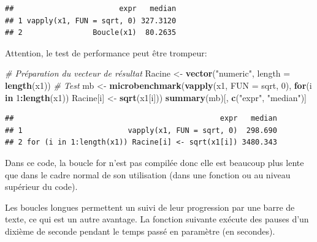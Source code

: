 \documentclass[
  12pt,
  french,
  a4paper,
  extrafontsizes,onecolumn,openright
  ]{memoir}
\newenvironment{Shaded}{\begin{snugshade}}{\end{snugshade}}
\newcommand{\CommentTok}[1]{\textcolor[rgb]{0.56,0.35,0.01}{\textit{#1}}}
\newcommand{\ControlFlowTok}[1]{\textcolor[rgb]{0.13,0.29,0.53}{\textbf{#1}}}
\newcommand{\DataTypeTok}[1]{\textcolor[rgb]{0.13,0.29,0.53}{#1}}
\newcommand{\DecValTok}[1]{\textcolor[rgb]{0.00,0.00,0.81}{#1}}
\newcommand{\KeywordTok}[1]{\textcolor[rgb]{0.13,0.29,0.53}{\textbf{#1}}}
\newcommand{\NormalTok}[1]{#1}
\newcommand{\OperatorTok}[1]{\textcolor[rgb]{0.81,0.36,0.00}{\textbf{#1}}}
\newcommand{\StringTok}[1]{\textcolor[rgb]{0.31,0.60,0.02}{#1}}
\newlength{\rf}
\begin{document}
\begin{verbatim}
##                        expr   median
## 1 vapply(x1, FUN = sqrt, 0) 327.3120
## 2                Boucle(x1)  80.2635
\end{verbatim}

\normalsize

Attention, le test de performance peut être trompeur:

\scriptsize

\begin{Shaded}
\begin{Highlighting}[]
\CommentTok{# Préparation du vecteur de résultat}
\NormalTok{Racine <-}\StringTok{ }\KeywordTok{vector}\NormalTok{(}\StringTok{"numeric"}\NormalTok{, }\DataTypeTok{length =} \KeywordTok{length}\NormalTok{(x1))}
\CommentTok{# Test}
\NormalTok{mb <-}\StringTok{ }\KeywordTok{microbenchmark}\NormalTok{(}\KeywordTok{vapply}\NormalTok{(x1, }\DataTypeTok{FUN =}\NormalTok{ sqrt, }\DecValTok{0}\NormalTok{), }
                     \ControlFlowTok{for}\NormalTok{(i }\ControlFlowTok{in} \DecValTok{1}\OperatorTok{:}\KeywordTok{length}\NormalTok{(x1)) }
\NormalTok{                       Racine[i] <-}\StringTok{ }\KeywordTok{sqrt}\NormalTok{(x1[i]))}
\KeywordTok{summary}\NormalTok{(mb)[, }\KeywordTok{c}\NormalTok{(}\StringTok{"expr"}\NormalTok{, }\StringTok{"median"}\NormalTok{)]}
\end{Highlighting}
\end{Shaded}

\begin{verbatim}
##                                               expr   median
## 1                        vapply(x1, FUN = sqrt, 0)  298.690
## 2 for (i in 1:length(x1)) Racine[i] <- sqrt(x1[i]) 3480.343
\end{verbatim}

\normalsize

Dans ce code, la boucle for n'est pas compilée donc elle est beaucoup plus lente que dans le cadre normal de son utilisation (dans une fonction ou au niveau supérieur du code).

Les boucles longues permettent un suivi de leur progression par une barre de texte, ce qui est un autre avantage.
La fonction suivante exécute des pauses d'un dixième de seconde pendant le temps passé en paramètre (en secondes).

\scriptsize
\end{document}
